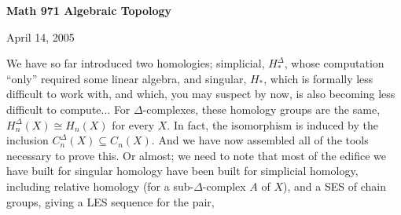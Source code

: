 \def\ccy{\Cyan}		  %
\def\cpb{\ProcessBlue}	  %
\def\csb{\SkyBlue}	  %
\def\ctu{\Turquoise}	  %
\def\ctb{\TealBlue}	  %
\def\caq{\Aquamarine}	  %
\def\cbg{\BlueGreen}	  %
\def\cem{\Emerald}	  %
\def\csg{\SeaGreen}	  %
\def\cgg{\Green}	  %
\def\cfg{\ForestGreen}	  %
\def\cpg{\PineGreen}	  %
\def\clg{\LimeGreen}	  %
\def\cyg{\YellowGreen}	  %
\def\cspg{\SpringGreen}	  %
\def\cog{\OliveGreen}	  %
\def\pars{\RawSienna}	  %
\def\cse{\Sepia}		  %
\def\cbr{\Brown}		  %
\def\cta{\Tan}		  %
\def\cgr{\Gray}		  %
\def\cbl{\Black}		  %
\def\cwh{\White}		  %


\loadmsbm



\def\ctln{\centerline}
\def\u{\underbar}
\def\ssk{\smallskip}
\def\msk{\medskip}
\def\bsk{\bigskip}
\def\hsk{\hskip.1in}
\def\hhsk{\hskip.2in}
\def\dsl{\displaystyle}
\def\hskp{\hskip1.5in}

\def\lra{$\Leftrightarrow$ }
\def\ra{\rightarrow}
\def\mpto{\logmapsto}
\def\pu{\pi_1}
\def\mpu{$\pi_1$}
\def\sig{\Sigma}
\def\msig{$\Sigma$}
\def\ep{\epsilon}
\def\sset{\subseteq}
\def\del{\partial}
\def\inv{^{-1}}
\def\wtl{\widetilde}
\def\lra{\Leftrightarrow}
\def\del{\partial}
\def\delp{\partial^\prime}
\def\delpp{\partial^{\prime\prime}}
\def\sgn{{\roman{sgn}}}
\def\wtih{\widetilde{H}}
\def\bbz{{\Bbb Z}}
\def\bbr{{\Bbb R}}



\ctln{\bf Math 971 Algebraic Topology}

\ssk

\ctln{April 14, 2005}

\msk


We have so far introduced two homologies; simplicial, $H_*^\Delta$, whose computation 
``only'' required some linear algebra,
and singular, $H_*$, which is formally less difficult to work with, and which, you may suspect by now, is also becoming
less difficult to compute... For $\Delta$-complexes, these homology groups are the same, $H_n^\Delta(X)\cong H_n(X)$
for every $X$. In fact, the isomorphism is induced by the inclusion $C_n^\Delta(X)\sset C_n(X)$. And we have
now assembled all of the tools necessary to prove this. Or almost; we need to note that most of the edifice we
have built for singular homology \u{could} have been built for simplicial homology, including relative 
homology (for a sub-$\Delta$-complex $A$ of $X$), and a SES of chain groups, giving a LES sequence for the pair,


